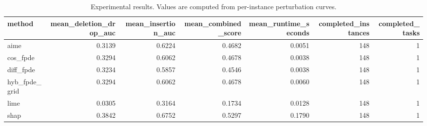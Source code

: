 \begin{table}[t]
\caption{Experimental results. Values are computed from per-instance perturbation curves.}
\label{tab:main_results_computed}
\centering
\begin{tabular}{lrrrrrr}
\toprule
method & mean\_deletion\_drop\_auc & mean\_insertion\_auc & mean\_combined\_score & mean\_runtime\_seconds & completed\_instances & completed\_tasks \\
\midrule
aime & 0.3139 & 0.6224 & 0.4682 & 0.0051 & 148 & 1 \\
cos\_fpde & 0.3294 & 0.6062 & 0.4678 & 0.0038 & 148 & 1 \\
diff\_fpde & 0.3234 & 0.5857 & 0.4546 & 0.0038 & 148 & 1 \\
hyb\_fpde\_grid & 0.3294 & 0.6062 & 0.4678 & 0.0060 & 148 & 1 \\
lime & 0.0305 & 0.3164 & 0.1734 & 0.0128 & 148 & 1 \\
shap & 0.3842 & 0.6752 & 0.5297 & 0.1790 & 148 & 1 \\
\bottomrule
\end{tabular}

\end{table}
